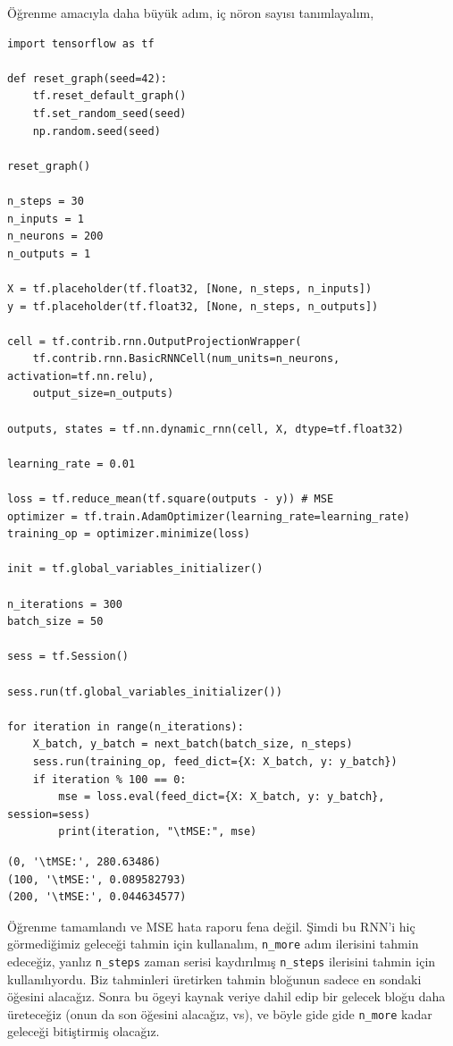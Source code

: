 \documentclass[12pt,fleqn]{article}\usepackage{../../common}
\begin{document}
Öğrenme amacıyla daha büyük adım, iç nöron sayısı tanımlayalım,

\begin{verbatim}
import tensorflow as tf

def reset_graph(seed=42):
    tf.reset_default_graph()
    tf.set_random_seed(seed)
    np.random.seed(seed)

reset_graph()

n_steps = 30
n_inputs = 1
n_neurons = 200
n_outputs = 1

X = tf.placeholder(tf.float32, [None, n_steps, n_inputs])
y = tf.placeholder(tf.float32, [None, n_steps, n_outputs])

cell = tf.contrib.rnn.OutputProjectionWrapper(
    tf.contrib.rnn.BasicRNNCell(num_units=n_neurons, activation=tf.nn.relu),
    output_size=n_outputs)

outputs, states = tf.nn.dynamic_rnn(cell, X, dtype=tf.float32)

learning_rate = 0.01

loss = tf.reduce_mean(tf.square(outputs - y)) # MSE
optimizer = tf.train.AdamOptimizer(learning_rate=learning_rate)
training_op = optimizer.minimize(loss)

init = tf.global_variables_initializer()

n_iterations = 300
batch_size = 50

sess = tf.Session()

sess.run(tf.global_variables_initializer())

for iteration in range(n_iterations):
    X_batch, y_batch = next_batch(batch_size, n_steps)
    sess.run(training_op, feed_dict={X: X_batch, y: y_batch})
    if iteration % 100 == 0:
        mse = loss.eval(feed_dict={X: X_batch, y: y_batch}, session=sess)
        print(iteration, "\tMSE:", mse)

\end{verbatim}

\begin{verbatim}
(0, '\tMSE:', 280.63486)
(100, '\tMSE:', 0.089582793)
(200, '\tMSE:', 0.044634577)
\end{verbatim}

Öğrenme tamamlandı ve MSE hata raporu fena değil. Şimdi bu RNN'i hiç
görmediğimiz geleceği tahmin için kullanalım, \verb!n_more! adım ilerisini
tahmin edeceğiz, yanlız \verb!n_steps! zaman serisi kaydırılmış
\verb!n_steps! ilerisini tahmin için kullanılıyordu. Biz tahminleri
üretirken tahmin bloğunun sadece en sondaki öğesini alacağız. Sonra bu
ögeyi kaynak veriye dahil edip bir gelecek bloğu daha üreteceğiz (onun da
son öğesini alacağız, vs), ve böyle gide gide \verb!n_more! kadar geleceği
bitiştirmiş olacağız. 
\end{document}

